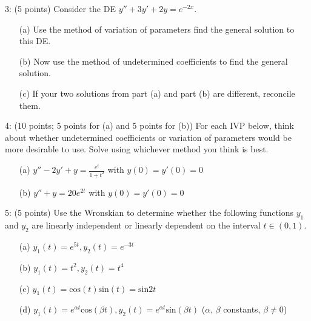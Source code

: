 \documentclass[12pt,letterpaper]{hmcpset}
\begin{document}
\begin{problem}
3: (5 points) Consider the DE $y'' + 3y' + 2y = e^{-2x}$.

\begin{enumerate}
    \item[(a)] Use the method of variation of parameters find the general solution to this DE.
    \item[(b)] Now use the method of undetermined coefficients to find the general solution.
    \item[(c)] If your two solutions from part (a) and part (b) are different, reconcile them.
\end{enumerate}
\end{problem}
\newpage

\begin{problem}
4: (10 points; 5 points for (a) and 5 points for (b)) For each IVP below, think about whether undetermined coefficients or variation of parameters would be more desirable to use. Solve using whichever method you think is best.
\begin{enumerate}
    \item[(a)] $y'' - 2y' + y= \frac{e^t}{1+t^2}$ with $y(0) = y'(0)=0$
    \item[(b)] $y'' +  y= 20e^{2t}$ with $y(0) = y'(0)=0$
\end{enumerate}

\end{problem}
\newpage

\begin{problem}
5: (5 points) Use the Wronskian to determine whether the following functions $y_1$ and $y_2$ are
linearly independent or linearly dependent on the interval $t \in (0, 1)$.
\begin{enumerate}
    \item[(a)] $y_1(t) = e^{5t}, y_2(t) = e^{-3t}$
    \item[(b)] $y_1(t) = t^2, y_2(t) = t^4$
    \item[(c)] $y_1(t) = \text{cos}(t) \text{sin}(t) = \text{sin}2t$
    \item[(d)] $y_1(t) = e^{\alpha t}\text{cos}(\beta t), y_2(t) = e^{\alpha t}\text{sin}(\beta t)$ ($\alpha$, $\beta$ constants, $\beta \neq 0$)
\end{enumerate}
\end{problem}
\newpage
\end{document}
